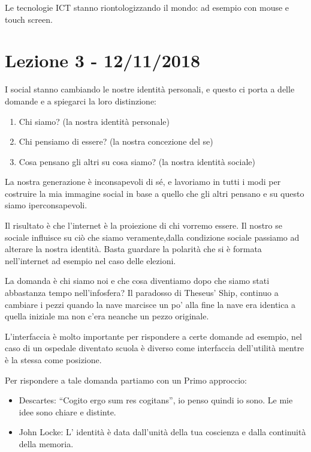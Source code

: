 \documentclass[]{article}
\begin{document}
Le tecnologie ICT stanno riontologizzando il mondo: ad esempio con mouse
e touch screen.
\section*{Lezione 3 - 12/11/2018}

I social stanno cambiando le nostre identità personali, e questo ci
porta a delle domande e a spiegarci la loro distinzione:

\begin{enumerate}
	\def\labelenumi{\arabic{enumi}.}
	 
	\item
	Chi siamo? (la nostra identità personale)
	\item
	Chi pensiamo di essere? (la nostra concezione del se)
	\item
	Cosa pensano gli altri su cosa siamo? (la nostra identità sociale)
\end{enumerate}

La nostra generazione è inconsapevoli di sé, e lavoriamo in tutti i modi
per costruire la mia immagine social in base a quello che gli altri
pensano e su questo siamo iperconsapevoli.

Il risultato è che l'internet è la proiezione di chi vorremo essere.
Il nostro se sociale influisce su ciò che siamo veramente,dalla 
condizione sociale passiamo ad alterare la nostra identità.
Basta guardare la polarità che si è formata nell'internet ad esempio nel
caso delle elezioni.

La domanda è chi siamo noi e che cosa diventiamo dopo che siamo stati
abbastanza tempo nell'infosfera? Il paradosso di Theseus' Ship, continuo
a cambiare i pezzi quando la nave marcisce un po' alla fine la nave era
identica a quella iniziale ma non c'era neanche un pezzo originale.

L'interfaccia è molto importante per rispondere a certe domande ad
esempio, nel caso di un ospedale diventato scuola è diverso come
interfaccia dell'utilità mentre è la stessa come posizione.

Per rispondere a tale domanda partiamo con un Primo approccio:

\begin{itemize}
	 
	\item
	Descartes: ``Cogito ergo sum res cogitans'', io penso quindi io sono.
	Le mie idee sono chiare e distinte.
	\item
	John Locke: L' identità è data dall'unità della tua coscienza e dalla
	continuità della memoria.
\end{itemize}
\end{document}

